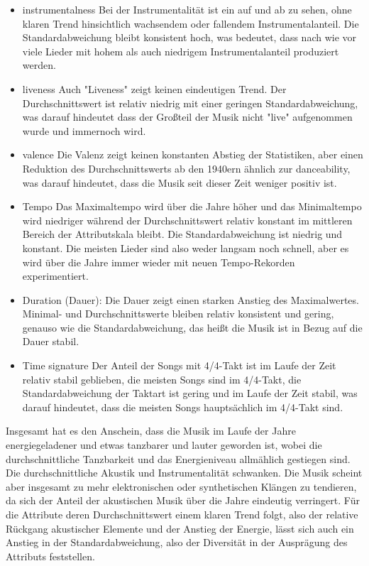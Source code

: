 \documentclass[conference]{IEEEtran}
\begin{document}
\begin{itemize}
\item{instrumentalness} Bei der Instrumentalität ist ein auf und ab zu sehen, ohne klaren Trend hinsichtlich wachsendem oder fallendem Instrumentalanteil. Die Standardabweichung bleibt konsistent hoch, was bedeutet, dass nach wie vor viele Lieder mit hohem als auch niedrigem Instrumentalanteil produziert werden.

\item{liveness} Auch "Liveness" zeigt keinen eindeutigen Trend. Der Durchschnittswert ist relativ niedrig mit einer geringen Standardabweichung, was darauf hindeutet dass der Großteil der Musik nicht "live" aufgenommen wurde und immernoch wird.

\item{valence} Die Valenz zeigt keinen konstanten Abstieg der Statistiken, aber einen Reduktion des Durchschnittswerts ab den 1940ern ähnlich zur danceability, was darauf hindeutet, dass die Musik seit dieser Zeit weniger positiv ist.

\item{Tempo} Das Maximaltempo wird über die Jahre höher und das Minimaltempo wird niedriger während der Durchschnittswert relativ konstant im mittleren Bereich der Attributskala bleibt. Die Standardabweichung ist niedrig und konstant. Die meisten Lieder sind also weder langsam noch schnell, aber es wird über die Jahre immer wieder mit neuen Tempo-Rekorden experimentiert.

\item{Duration} (Dauer): Die Dauer zeigt einen starken Anstieg des Maximalwertes. Minimal- und Durchschnittswerte bleiben relativ konsistent und gering, genauso wie die Standardabweichung, das heißt die Musik ist in Bezug auf die Dauer stabil.

\item{Time signature} Der Anteil der Songs mit 4/4-Takt ist im Laufe der Zeit relativ stabil geblieben, die meisten Songs sind im 4/4-Takt, die Standardabweichung der Taktart ist gering und im Laufe der Zeit stabil, was darauf hindeutet, dass die meisten Songs hauptsächlich im 4/4-Takt sind.
\end{itemize}

Insgesamt hat es den Anschein, dass die Musik im Laufe der Jahre energiegeladener und etwas tanzbarer und lauter geworden ist, wobei die durchschnittliche Tanzbarkeit und das Energieniveau allmählich gestiegen sind. Die durchschnittliche Akustik und Instrumentalität schwanken. Die Musik scheint aber insgesamt zu mehr elektronischen oder synthetischen Klängen zu tendieren, da sich der Anteil der akustischen Musik über die Jahre eindeutig verringert. Für die Attribute deren Durchschnittswert einem klaren Trend folgt, also der relative Rückgang akustischer Elemente und der Anstieg der Energie, lässt sich auch ein Anstieg in der Standardabweichung, also der Diversität in der Ausprägung des Attributs feststellen.
\end{document}
